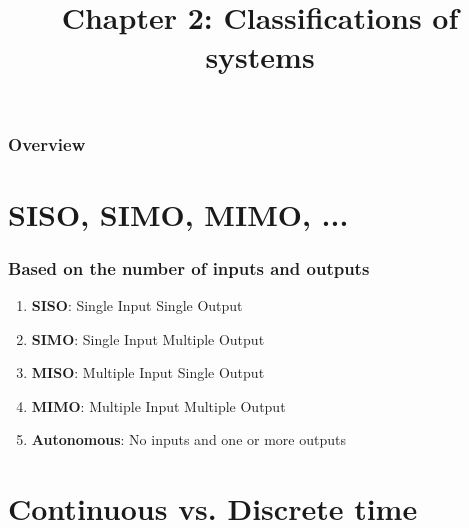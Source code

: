 \documentclass{beamer}
\title{Chapter 2: Classifications of systems}
\author{}
\begin{document}
	
	\begin{frame}
		\titlepage %
	\end{frame}
	
	\begin{frame}
		\frametitle{Overview} %
		\tableofcontents %
	\end{frame}
	
	
	\section{SISO, SIMO, MIMO, ...} 
	
	\begin{frame}
		\frametitle{Based on the number of inputs and outputs}
		\vspace{-8ex}
		\begin{enumerate}
			\item \textbf{SISO}: Single Input Single Output
			\medskip
			\item \textbf{SIMO}: Single Input Multiple Output
			\medskip
			\item \textbf{MISO}: Multiple Input Single Output
			\medskip
			\item \textbf{MIMO}: Multiple Input Multiple Output
			\medskip
			\item \textbf{Autonomous}: No inputs and one or more outputs
		\end{enumerate}
	\end{frame}
	
	\section{Continuous vs. Discrete time} 
	
\end{document}
